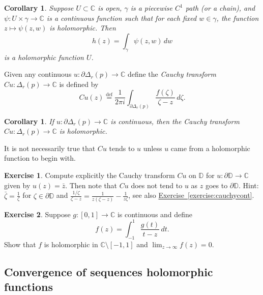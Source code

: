 \documentclass[12pt,openany]{book}
\newcommand{\C}{{\mathbb{C}}}
\newcommand{\D}{{\mathbb{D}}}
\newcommand{\myindex}[1]{#1\index{#1}}
\theoremstyle{plain}
\newtheorem{cor}[thm]{Corollary}
\theoremstyle{remark}
\theoremstyle{definition}
\newenvironment{exbox}{%
    \def\FrameCommand{\vrule width 1pt \relax\hspace {10pt}}%
    \MakeFramed {\advance \hsize -\width \FrameRestore }%
}{%
    \endMakeFramed
}
\theoremstyle{exercise}
\newtheorem{exercise}{Exercise}[section]
\theoremstyle{example}
\newcommand{\exerciseref}[1]{\hyperref[#1]{Exercise~\ref*{#1}}}
\begin{document}
\begin{cor} \label{cor:holfuncbyintegral}
Suppose $U \subset \C$ is open, $\gamma$ is a
piecewise $C^1$ path (or a chain), and
$\psi \colon U \times \gamma \to \C$ is a continuous function such that
for each fixed $w \in \gamma$, the function $z \mapsto \psi(z,w)$ is
holomorphic.  Then
\begin{equation*}
h(z) =
\int_\gamma \psi(z,w) \, dw
\end{equation*}
is a holomorphic function $U$.
\end{cor}

Given any continuous $u \colon \partial \Delta_r(p) \to \C$ define
the \emph{\myindex{Cauchy transform}} $Cu \colon \Delta_r(p) \to \C$ is defined by
\begin{equation*}
Cu(z)
\overset{\text{def}}{=}
\frac{1}{2\pi i}
\int_{\partial \Delta_r(p)}
\frac{f(\zeta)}{\zeta-z}\, d\zeta .
\end{equation*}

\begin{cor}
If $u \colon \partial \Delta_r(p) \to \C$ is continuous, then
the Cauchy transform $Cu \colon \Delta_r(p) \to \C$ is holomorphic.
\end{cor}

It is not necessarily true that $Cu$ tends to $u$ unless $u$ came from 
a holomorphic function to begin with.

\begin{exbox}
\begin{exercise}
Compute explicitly
the Cauchy transform $Cu$ on $\D$ for $u \colon \partial \D \to \C$
given by $u(z) = \bar{z}$.  Then note that $Cu$ does not tend to $u$
as $z$ goes to $\partial \D$.
Hint: $\bar{\zeta} = \frac{1}{\zeta}$ for
$\zeta \in \partial \D$
and $\frac{1/\zeta}{\zeta-z} = \frac{1}{z(\zeta-z)} - \frac{1}{z \zeta}$,
see also \exerciseref{exercise:cauchycont}.
\end{exercise}

\begin{exercise}
Suppose $g \colon [0,1] \to \C$ is continuous and define
\begin{equation*}
f(z) = \int_{-1}^1 \frac{g(t)}{t-z} \, dt .
\end{equation*}
Show that $f$ is holomorphic in $\C \setminus [-1,1]$ and
$\lim_{z \to \infty} f(z) = 0$.
\end{exercise}
\end{exbox}

\subsection{Convergence of sequences holomorphic functions}
\end{document}
